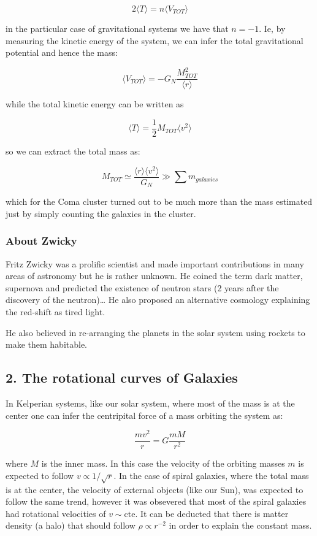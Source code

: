 \documentclass[
  letterpaper,
  DIV=11,
  numbers=noendperiod]{scrreprt}
\begin{document}
\[2\langle T \rangle = n \langle V_{TOT} \rangle \]

in the particular case of gravitational systems we have that \(n = -1\).
Ie, by measuring the kinetic energy of the system, we can infer the
total gravitational potential and hence the mass:

\[\langle V_{TOT} \rangle = - G_N \frac{M_{TOT}^2}{\langle r \rangle}\]

while the total kinetic energy can be written as

\[\langle T \rangle = \frac{1}{2}M_{TOT}\langle v^2 \rangle\]

so we can extract the total mass as:

\[M_{TOT} \simeq \frac{\langle r \rangle \langle v^2 \rangle}{G_N} \gg \sum m_{galaxies} \]

which for the Coma cluster turned out to be much more than the mass
estimated just by simply counting the galaxies in the cluster.

\subsubsection{About Zwicky}\label{about-zwicky}

Fritz Zwicky was a prolific scientist and made important contributions
in many areas of astronomy but he is rather unknown. He coined the term
dark matter, supernova and predicted the existence of neutron stars (2
years after the discovery of the neutron)\ldots{} He also proposed an
alternative cosmology explaining the red-shift as tired light.

He also believed in re-arranging the planets in the solar system using
rockets to make them habitable.

\subsection{2. The rotational curves of
Galaxies}\label{the-rotational-curves-of-galaxies}

In Kelperian systems, like our solar system, where most of the mass is
at the center one can infer the centripital force of a mass orbiting the
system as:

\[\frac{m v^2}{r} = G \frac{m M}{r^2}\]

where \(M\) is the inner mass. In this case the velocity of the orbiting
masses \(m\) is expected to follow \(v \propto 1/\sqrt{r}\). In the case
of spiral galaxies, where the total mass is at the center, the velocity
of external objects (like our Sun), was expected to follow the same
trend, however it was obsevered that most of the spiral galaxies had
rotational velocities of \(v \sim \mathrm{cte}\). It can be deducted
that there is matter density (a halo) that should follow
\(\rho \propto r^{-2}\) in order to explain the constant mass.
\end{document}
